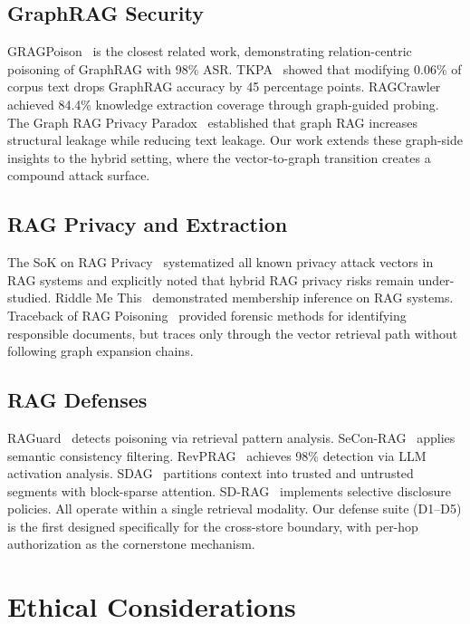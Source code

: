 \documentclass[letterpaper,twocolumn,10pt]{article}
\begin{document}
\subsection{GraphRAG Security}

GRAGPoison~\cite{gragpoison2026} is the closest related work,
demonstrating relation-centric poisoning of GraphRAG with 98\% ASR.
TKPA~\cite{fewwords2025} showed that modifying 0.06\% of corpus text
drops GraphRAG accuracy by 45 percentage points.
RAGCrawler~\cite{ragcrawler2026} achieved 84.4\% knowledge extraction
coverage through graph-guided probing. The Graph RAG Privacy
Paradox~\cite{graphragprivacy2025} established that graph RAG
increases structural leakage while reducing text leakage. Our work
extends these graph-side insights to the hybrid setting, where the
vector-to-graph transition creates a compound attack surface.

\subsection{RAG Privacy and Extraction}

The SoK on RAG Privacy~\cite{sokprivacy2026} systematized all known
privacy attack vectors in RAG systems and explicitly noted that hybrid
RAG privacy risks remain under-studied. Riddle Me
This~\cite{riddleme2025} demonstrated membership inference on RAG
systems. Traceback of RAG
Poisoning~\cite{traceback2025} provided forensic methods for
identifying responsible documents, but traces only through the vector
retrieval path without following graph expansion chains.

\subsection{RAG Defenses}

RAGuard~\cite{raguard2025} detects poisoning via retrieval pattern
analysis. SeCon-RAG~\cite{seconrag2025} applies semantic consistency
filtering. RevPRAG~\cite{revprag2025} achieves 98\% detection via
LLM activation analysis. SDAG~\cite{sdag2026} partitions context
into trusted and untrusted segments with block-sparse attention.
SD-RAG~\cite{sdrag2026} implements selective disclosure policies.
All operate within a single retrieval modality. Our defense suite
(D1--D5) is the first designed specifically for the cross-store
boundary, with per-hop authorization as the cornerstone mechanism.

\section*{Ethical Considerations}
\end{document}
